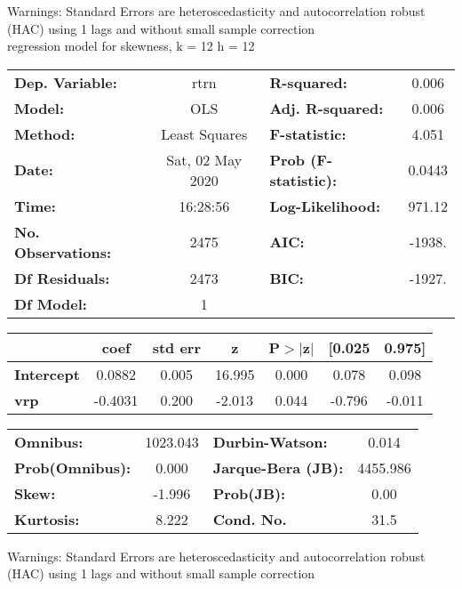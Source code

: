 Warnings: \newline
 [1] Standard Errors are heteroscedasticity and autocorrelation robust (HAC) using 1 lags and without small sample correction\\ 

regression model for skewness, k = 12 h = 12\begin{center}
\begin{tabular}{lclc}
\toprule
\textbf{Dep. Variable:}    &       rtrn       & \textbf{  R-squared:         } &     0.006   \\
\textbf{Model:}            &       OLS        & \textbf{  Adj. R-squared:    } &     0.006   \\
\textbf{Method:}           &  Least Squares   & \textbf{  F-statistic:       } &     4.051   \\
\textbf{Date:}             & Sat, 02 May 2020 & \textbf{  Prob (F-statistic):} &   0.0443    \\
\textbf{Time:}             &     16:28:56     & \textbf{  Log-Likelihood:    } &    971.12   \\
\textbf{No. Observations:} &        2475      & \textbf{  AIC:               } &    -1938.   \\
\textbf{Df Residuals:}     &        2473      & \textbf{  BIC:               } &    -1927.   \\
\textbf{Df Model:}         &           1      & \textbf{                     } &             \\
\bottomrule
\end{tabular}
\begin{tabular}{lcccccc}
                   & \textbf{coef} & \textbf{std err} & \textbf{z} & \textbf{P$> |$z$|$} & \textbf{[0.025} & \textbf{0.975]}  \\
\midrule
\textbf{Intercept} &       0.0882  &        0.005     &    16.995  &         0.000        &        0.078    &        0.098     \\
\textbf{vrp}       &      -0.4031  &        0.200     &    -2.013  &         0.044        &       -0.796    &       -0.011     \\
\bottomrule
\end{tabular}
\begin{tabular}{lclc}
\textbf{Omnibus:}       & 1023.043 & \textbf{  Durbin-Watson:     } &    0.014  \\
\textbf{Prob(Omnibus):} &   0.000  & \textbf{  Jarque-Bera (JB):  } & 4455.986  \\
\textbf{Skew:}          &  -1.996  & \textbf{  Prob(JB):          } &     0.00  \\
\textbf{Kurtosis:}      &   8.222  & \textbf{  Cond. No.          } &     31.5  \\
\bottomrule
\end{tabular}
\end{center}

Warnings: \newline
 [1] Standard Errors are heteroscedasticity and autocorrelation robust (HAC) using 1 lags and without small sample correction\\ 

